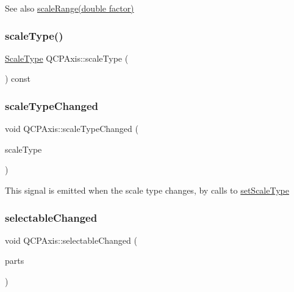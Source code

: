 \begin{DoxySeeAlso}{See also}
\hyperlink{class_q_c_p_axis_a31d18ddf3a4f21ceb077db8ae5b69856}{scale\+Range(double factor)} 
\end{DoxySeeAlso}
\mbox{\label{class_q_c_p_axis_ad23e9ad97b44e9aeaf4fab8904280098}} 
\subsubsection{\texorpdfstring{scale\+Type()}{scaleType()}}
{\footnotesize\ttfamily \hyperlink{class_q_c_p_axis_a36d8e8658dbaa179bf2aeb973db2d6f0}{Scale\+Type} Q\+C\+P\+Axis\+::scale\+Type (\begin{DoxyParamCaption}{ }\end{DoxyParamCaption}) const\hspace{0.3cm}{\ttfamily [inline]}}

\mbox{\label{class_q_c_p_axis_a3505ed8a93bd2e349d858d84996bf767}} 
\subsubsection{\texorpdfstring{scale\+Type\+Changed}{scaleTypeChanged}}
{\footnotesize\ttfamily void Q\+C\+P\+Axis\+::scale\+Type\+Changed (\begin{DoxyParamCaption}\item[{\hyperlink{class_q_c_p_axis_a36d8e8658dbaa179bf2aeb973db2d6f0}{Q\+C\+P\+Axis\+::\+Scale\+Type}}]{scale\+Type }\end{DoxyParamCaption})\hspace{0.3cm}{\ttfamily [signal]}}

This signal is emitted when the scale type changes, by calls to \hyperlink{class_q_c_p_axis_adef29cae617af4f519f6c40d1a866ca6}{set\+Scale\+Type} \mbox{\label{class_q_c_p_axis_aa5ff1fd851139028a3bb4efcb31de9fc}} 
\subsubsection{\texorpdfstring{selectable\+Changed}{selectableChanged}}
{\footnotesize\ttfamily void Q\+C\+P\+Axis\+::selectable\+Changed (\begin{DoxyParamCaption}\item[{const Q\+C\+P\+Axis\+::\+Selectable\+Parts \&}]{parts }\end{DoxyParamCaption})\hspace{0.3cm}{\ttfamily [signal]}}


